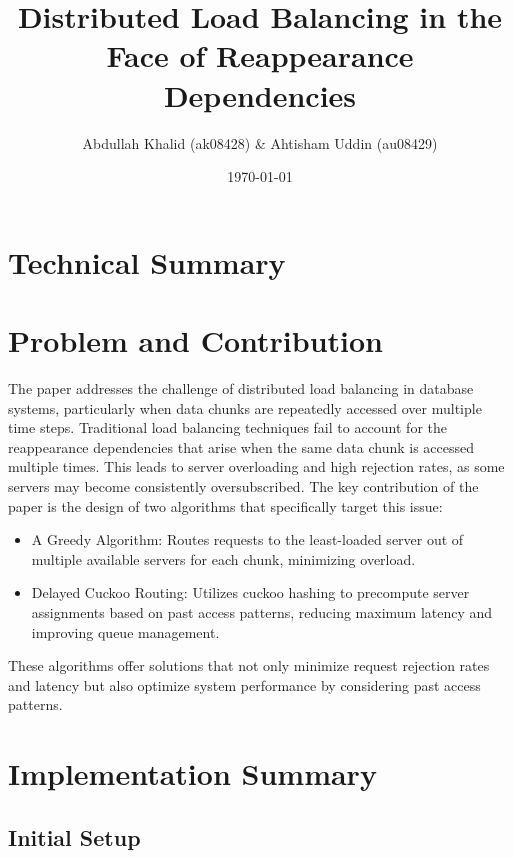 \documentclass{article}
\title{Distributed Load Balancing in the Face of Reappearance Dependencies}
\author{Abdullah Khalid (ak08428) \& Ahtisham Uddin (au08429)}
\date{\today}
\begin{document}
\maketitle

{\centering
\section*{Technical Summary}
}


\section{Problem and Contribution}
The paper addresses the challenge of distributed load balancing in database systems, particularly when data chunks are repeatedly accessed over multiple time steps. Traditional load balancing techniques fail to account for the reappearance dependencies that arise when the same data chunk is accessed multiple times. This leads to server overloading and high rejection rates, as some servers may become consistently oversubscribed. The key contribution of the paper is the design of two algorithms that specifically target this issue:
\begin{itemize}
    \item A Greedy Algorithm: Routes requests to the least-loaded server out of multiple available servers for each chunk, minimizing overload.
    \item Delayed Cuckoo Routing: Utilizes cuckoo hashing to precompute server assignments based on past access patterns, reducing maximum latency and improving queue management.
\end{itemize}

These algorithms offer solutions that not only minimize request rejection rates and latency but also optimize system performance by considering past access patterns.



\section*{Implementation Summary}

\subsection*{Initial Setup}
\end{document}
